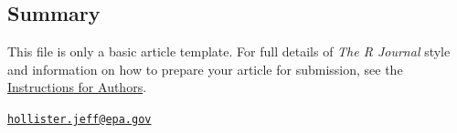 \subsection{Summary}\label{summary}

This file is only a basic article template. For full details of
\emph{The R Journal} style and information on how to prepare your
article for submission, see the
\href{https://journal.r-project.org/share/author-guide.pdf}{Instructions
for Authors}. 

\address{%
Jeffrey W. Hollister\\
U.S. Environmental Protection Agency, Office of Research and
Development, National Health and Environmental Effects Research
Laboratory, Atlantic Ecology Division\\
27 Tarzwell Drive\\ Narragansett, RI 02882\\
}
\href{mailto:hollister.jeff@epa.gov}{\nolinkurl{hollister.jeff@epa.gov}}

